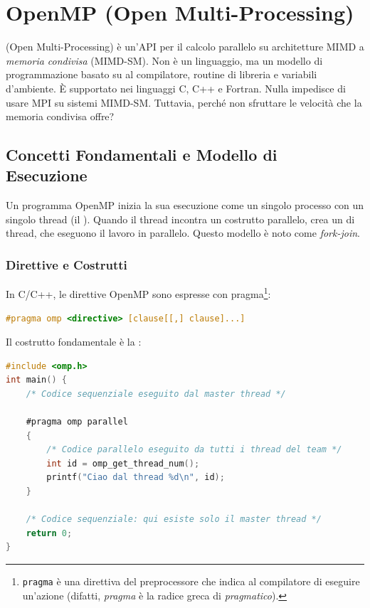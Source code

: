 \chapter{OpenMP (Open Multi-Processing)}

 (Open Multi-Processing) è un'API per il calcolo parallelo su architetture MIMD a \emph{memoria condivisa} (MIMD-SM). 
Non è un linguaggio, ma un modello di programmazione basato su  al compilatore, routine di libreria e variabili d'ambiente. 
È supportato nei linguaggi C, C++ e Fortran.
Nulla impedisce di usare MPI su sistemi MIMD-SM. Tuttavia, perché non sfruttare le velocità che la memoria condivisa offre?

\section{Concetti Fondamentali e Modello di Esecuzione}
Un programma OpenMP inizia la sua esecuzione come un singolo processo con un singolo thread (il ). 
Quando il thread incontra un costrutto parallelo, crea un  di thread, che eseguono il lavoro in parallelo. Questo modello è noto come \emph{fork-join}.

\subsection{Direttive e Costrutti}
In C/C++, le direttive OpenMP sono espresse con pragma\footnote{\texttt{pragma} è una direttiva del preprocessore che indica al compilatore di eseguire un'azione (difatti, \emph{pragma} è la radice greca di \emph{pragmatico}).}:
\begin{lstlisting}[language=C, numbers=none]
#pragma omp <directive> [clause[[,] clause]...]
\end{lstlisting}

Il costrutto fondamentale è la :
\begin{lstlisting}[language=C, numbers=none]
#include <omp.h>
int main() {
    /* Codice sequenziale eseguito dal master thread */

    #pragma omp parallel
    {
        /* Codice parallelo eseguito da tutti i thread del team */
        int id = omp_get_thread_num();
        printf("Ciao dal thread %d\n", id);
    }

    /* Codice sequenziale: qui esiste solo il master thread */
    return 0;
}
\end{lstlisting}

